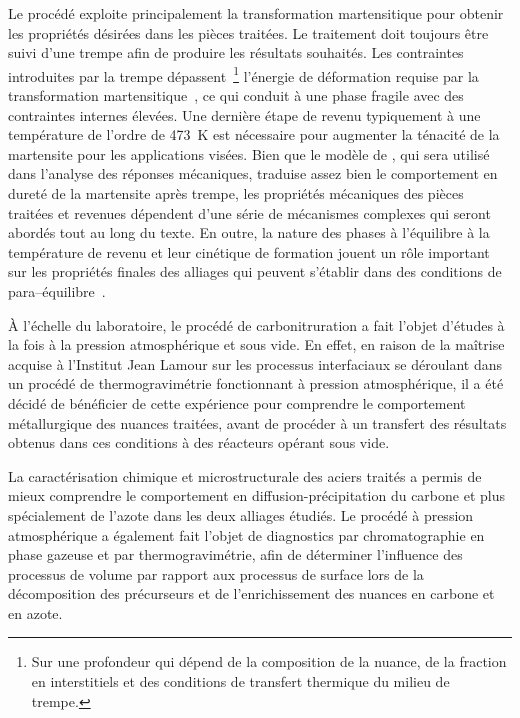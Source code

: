 Le procédé exploite principalement la transformation martensitique pour obtenir les propriétés désirées dans les pièces traitées. Le traitement doit toujours être suivi d'une trempe afin de produire les résultats souhaités. Les contraintes introduites par la trempe dépassent~\footnote{Sur une profondeur qui dépend de la composition de la nuance, de la fraction en interstitiels et des conditions de transfert thermique du milieu de trempe.} l'énergie de déformation requise par la transformation martensitique~\cite{Khachaturyan1983}, ce qui conduit à une phase fragile avec des contraintes internes élevées.  Une dernière étape de revenu \textendash{} typiquement à une température de l'ordre de \SI{473}{\kelvin} \textendash{} est nécessaire pour augmenter la ténacité de la martensite pour les applications visées. Bien que le modèle de \citet{Norstrom1976}, qui sera utilisé dans l'analyse des réponses mécaniques, traduise assez bien le comportement en dureté de la martensite après trempe, les propriétés mécaniques des pièces traitées et revenues dépendent d'une série de mécanismes complexes qui seront abordés tout au long du texte. En outre, la nature des phases à l'équilibre à la température de revenu et leur cinétique de formation jouent un rôle important sur les propriétés finales des alliages qui peuvent s'établir dans des conditions de para--équilibre~\cite{Ghosh2001}.

À l'échelle du laboratoire, le procédé de carbonitruration a fait l'objet d'études à la fois à la pression atmosphérique et sous vide.  En effet, en raison de la maîtrise acquise à l'Institut Jean Lamour sur les processus interfaciaux se déroulant dans un procédé de thermogravimétrie fonctionnant à pression atmosphérique, il a été décidé de bénéficier de cette expérience pour comprendre le comportement métallurgique des nuances traitées, avant de procéder à un transfert des résultats obtenus dans ces conditions à des réacteurs opérant sous vide.

La caractérisation chimique et microstructurale des aciers traités a permis de mieux comprendre le comportement en diffusion-précipitation du carbone et plus spécialement de l'azote dans les deux alliages étudiés.  Le procédé à pression atmosphérique a également fait l'objet de diagnostics par chromatographie en phase gazeuse et par thermogravimétrie, afin de déterminer l'influence des processus de volume par rapport aux processus de surface lors de la décomposition des précurseurs et de l'enrichissement des nuances en carbone et en azote.


